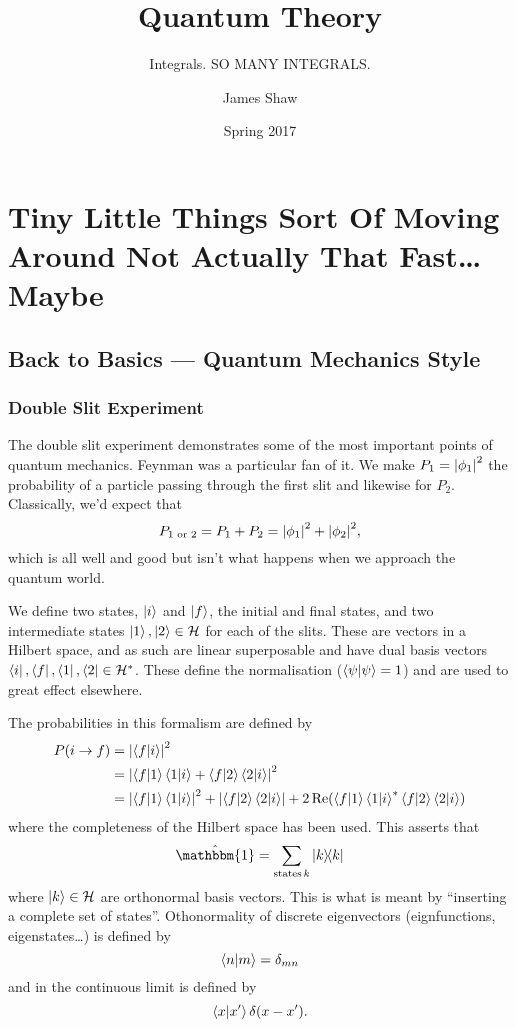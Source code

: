 \documentclass[]{scrreprt}
\title{Quantum Theory}
\subtitle{Integrals. SO MANY INTEGRALS.}
\author{James Shaw}
\date{Spring 2017}
\begin{document}


\tableofcontents %

\part{Tiny Little Things Sort Of Moving Around Not Actually That Fast\ldots{} Maybe}

\chapter{Back to Basics --- Quantum Mechanics Style}
\section{Double Slit Experiment}

The double slit experiment demonstrates some of the most important points of quantum mechanics.
Feynman was a particular fan of it. We make $P_1 = \abs{\phi_1}^2$ the probability of a particle passing through the first slit and likewise for $P_2$.
Classically, we'd expect that $$P_{1\text{ or }2} = P_1 + P_2 = \abs{\phi_1}^2 + \abs{\phi_2}^2,$$ which is all well and good but isn't what happens when we approach the quantum world.

We define two states, $\ket{i}$ and $\ket{f}$, the initial and final states, and two intermediate states $\ket{1}, \ket{2} \in \mathcal{H}$ for each of the slits.
These are vectors in a Hilbert space, and as such are linear superposable and have dual basis vectors $\bra{i}, \bra{f}, \bra{1}, \bra{2} \in \mathcal{H}^\ast$.
These define the normalisation ($\braket{\psi} = 1$) and are used to great effect elsewhere.

The probabilities in this formalism are defined by
\begin{align*}
  P(i \to f) &= \abs{\bra{f}\ket{i}}^2\\
   &= \abs{\bra{f}\ket{1}\bra{1}\ket{i} + \bra{f}\ket{2}\bra{2}\ket{i}}^2\\
  &= \abs{\bra{f}\ket{1}\bra{1}\ket{i}}^2 + \abs{\bra{f}\ket{2}\bra{2}\ket{i}} + 2 \Re(\bra{f}\ket{1}\bra{1}\ket{i}^\ast \bra{f}\ket{2}\bra{2}\ket{i})
\end{align*}
where the completeness of the Hilbert space has been used.
This asserts that \[ \hat{\mathbbm{1}} = \sum_{\text{states}\, k} \dyad{k}\] where \( \ket{k}\in\mathcal{H} \) are orthonormal basis vectors.
This is what is meant by ``inserting a complete set of states''.
Othonormality of discrete eigenvectors (eignfunctions, eigenstates\ldots) is defined by \[ \braket{n}{m} = \delta_{mn}\] and in the continuous limit is defined by \[\braket{x}{x^\prime} \delta(x-x^\prime).\]
\end{document}
